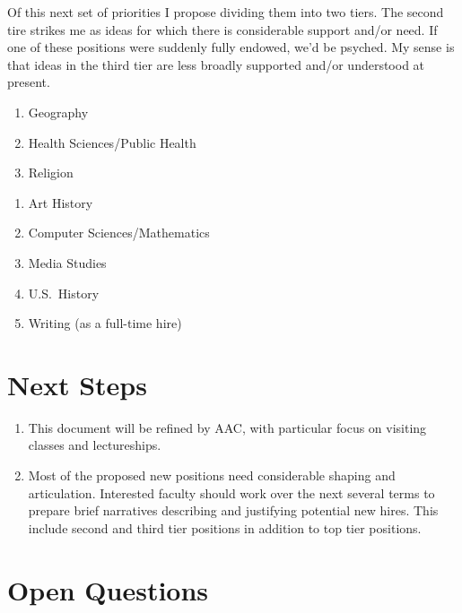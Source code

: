 \documentclass[12pt]{article}
\begin{document}
Of this next set of priorities I propose dividing them into two
tiers.  The second tire strikes me as ideas for which there is
considerable support and/or need.  If one of these positions were
suddenly fully endowed, we'd be psyched. My sense is that ideas in the
third tier are less broadly supported and/or understood at present.\\ 

\begin{enumerate}
\setlength{\itemsep}{-1mm}
    \item Geography
    \item Health Sciences/Public Health
    \item Religion
\end{enumerate}

\begin{enumerate}
\setlength{\itemsep}{-1mm}
    \item Art History
    \item Computer Sciences/Mathematics
    \item Media Studies
    \item U.S.~History
    \item Writing (as a full-time hire)
\end{enumerate}


\section{Next Steps}
\label{questions}

\begin{enumerate}

\item This document will be refined by AAC, with particular focus on
visiting classes and lectureships.

\item Most of the proposed new positions need considerable shaping and
articulation.  Interested faculty should work over the next several
terms to prepare brief narratives describing and justifying potential
new hires.  This include second and third tier positions in addition
to top tier positions.

\end{enumerate}


\section{Open Questions}
\end{document}
